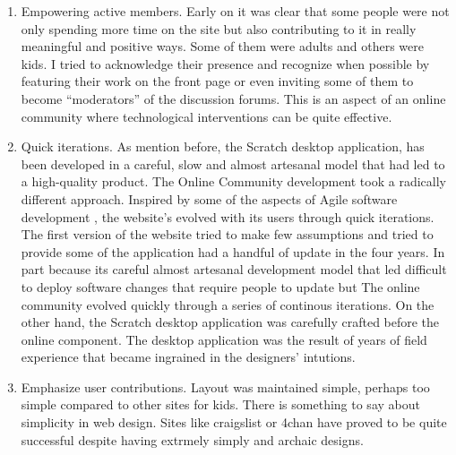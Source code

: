 \begin{enumerate}
\item Empowering active members.
Early on it was clear that some people were not only spending more time on the site but also contributing to it in really meaningful and positive ways.
Some of them were adults and others were kids.
I tried to acknowledge their presence and recognize when possible by featuring their work on the front page or even inviting some of them to become ``moderators'' of the discussion forums. 
This is an aspect of an online community where technological interventions can be quite effective.

\item Quick iterations.
As mention before, the Scratch desktop application, has been developed in a careful, slow and almost artesanal model that had led to a high-quality product.
The Online Community development took a radically different approach.
Inspired by some of the aspects of Agile software development \cite{TODO}, the website's evolved with its users through quick iterations.
The first version of the website tried to make few assumptions and tried to provide some of the
application had a handful of update in the four years. 
In part because its careful almost artesanal development model that led  difficult to deploy software changes that require people to update but
The online community evolved quickly through a series of continous iterations. On the other hand, the Scratch desktop application was carefully crafted before the online component. The desktop application was the result of years of field experience that became ingrained in the designers' intutions. 

\item Emphasize user contributions.
Layout was maintained simple, perhaps too simple compared to other sites for kids.
There is something to say about simplicity in web design.
Sites like craigslist or 4chan have proved to be quite successful despite having extrmely simply and archaic designs.


\end{enumerate}
